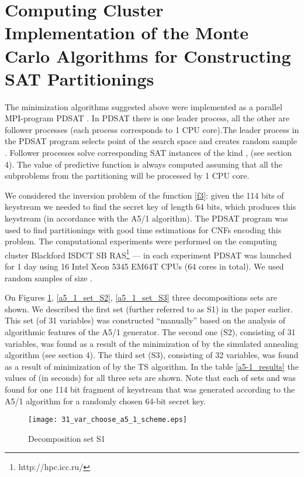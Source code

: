\documentclass[runningheads,a4paper]{llncs}
\begin{document}
\section{Computing Cluster Implementation of the Monte Carlo Algorithms for Constructing SAT Partitionings}

The minimization algorithms suggested above were implemented as a parallel MPI-program \textsc{\textsc{PDSAT}} \cite{DBLP:journals/corr/SemenovZ13}. In \textsc{\textsc{PDSAT}} there is one leader process, all the other are follower processes (each process corresponds to 1 CPU core).The leader process in the \textsc{PDSAT} program selects point  of the search space and creates random sample . Follower processes solve corresponding SAT instances of the kind ,  (see section 4). The value of predictive function is always computed assuming that all the subproblems from the partitioning  will be processed by 1 CPU core. 

We considered the inversion problem of the function \eqref{f3}: given the 114 bits of keystream we needed to find the secret key of length 64 bits, which produces this keystream (in accordance with the A5/1 algorithm). The \textsc{\textsc{PDSAT}} program was used to find partitionings with good time estimations for CNFs encoding this problem. The computational experiments were performed on the computing cluster Blackford ISDCT SB RAS\footnote{http://hpc.icc.ru/} --– in each experiment \textsc{\textsc{PDSAT}} was launched for 1 day using 16 Intel Xeon 5345 EM64T CPUs (64 cores in total). We used random samples of size .

On Figures \ref{a5_1_set_S1}, \ref{a5_1_set_S2}, \ref{a5_1_set_S3} three decompositions sets are shown. We described the first set (further referred to as S1) in the paper \cite{DBLP:conf/pact/SemenovZBP11} earlier. This set (of 31 variables) was constructed ``manually'' based on the analysis of algorithmic features of the A5/1 generator. The second one (S2), consisting of 31 variables, was found as a result of the minimization of  by the simulated annealing algorithm (see section 4). The third set (S3), consisting of 32 variables, was found as a result of minimization of  by the TS algorithm. In the table \ref{a5-1_results} the values of  (in seconds) for all three sets are shown. Note that each of sets  and  was found for one 114 bit fragment of keystream that was generated according to the A5/1 algorithm for a randomly chosen 64-bit secret key.

\begin{figure}[!ht]
	\centering
		\texttt{[image: 31\_var\_choose\_a5\_1\_scheme.eps]}
	\caption{Decomposition set S1}
	\label{a5_1_set_S1}
\end{figure}
\end{document}
